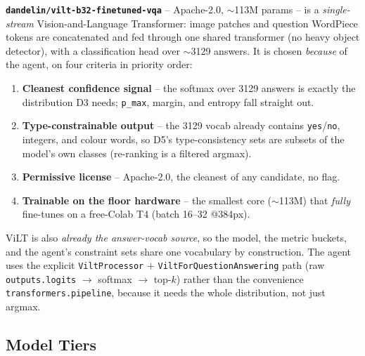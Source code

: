 \documentclass[12pt,a4paper]{article}
\begin{document}
\textbf{\texttt{dandelin/vilt-b32-finetuned-vqa}} -- Apache-2.0, $\sim$113M params -- is a \emph{single-stream} Vision-and-Language Transformer: image patches and question WordPiece tokens are concatenated and fed through one shared transformer (no heavy object detector), with a classification head over $\sim$3129 answers. It is chosen \emph{because} of the agent, on four criteria in priority order:
\begin{enumerate}\setlength\itemsep{0.1em}
  \item \textbf{Cleanest confidence signal} -- the softmax over 3129 answers is exactly the distribution D3 needs; \texttt{p\_max}, margin, and entropy fall straight out.
  \item \textbf{Type-constrainable output} -- the 3129 vocab already contains \texttt{yes}/\texttt{no}, integers, and colour words, so D5's type-consistency sets are subsets of the model's own classes (re-ranking is a filtered argmax).
  \item \textbf{Permissive license} -- Apache-2.0, the cleanest of any candidate, no flag.
  \item \textbf{Trainable on the floor hardware} -- the smallest core ($\sim$113M) that \emph{fully} fine-tunes on a free-Colab T4 (batch 16--32 @384px).
\end{enumerate}
ViLT is also \emph{already the answer-vocab source}, so the model, the metric buckets, and the agent's constraint sets share one vocabulary by construction. The agent uses the explicit \texttt{ViltProcessor} $+$ \texttt{ViltForQuestionAnswering} path (raw \texttt{outputs.logits} $\rightarrow$ softmax $\rightarrow$ top-$k$) rather than the convenience \texttt{transformers.pipeline}, because it needs the whole distribution, not just argmax.

\subsection{Model Tiers}
\end{document}
